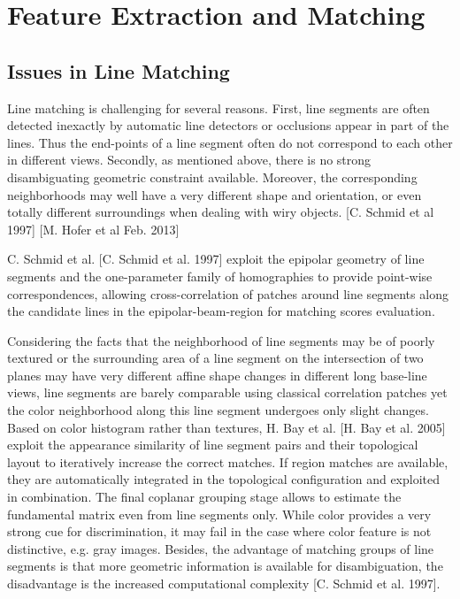 \section{Feature Extraction and Matching}


\subsection{Issues in Line Matching}

Line matching is challenging for several reasons. First, line segments are often detected inexactly by automatic line detectors or occlusions appear in part of the lines. Thus the end-points of a line segment often do not correspond to each other in different views. Secondly, as mentioned above, there is no strong disambiguating geometric constraint available. Moreover, the corresponding neighborhoods may well have a very different shape and orientation, or even totally different surroundings when dealing with wiry objects. [C. Schmid et al 1997] [M. Hofer et al Feb. 2013]

C. Schmid et al. [C. Schmid et al. 1997] exploit the epipolar geometry of line segments and the one-parameter family of homographies to provide point-wise correspondences, allowing cross-correlation of patches around line segments along the candidate lines in the epipolar-beam-region for matching scores evaluation.

Considering the facts that the neighborhood of line segments may be of poorly textured or the surrounding area of a line segment on the intersection of two planes may have very different affine shape changes in different long base-line views, line segments are barely comparable using classical correlation patches yet the color neighborhood along this line segment undergoes only slight changes. Based on color histogram rather than textures, H. Bay et al. [H. Bay et al. 2005] exploit the appearance similarity of line segment pairs and their topological layout to iteratively increase the correct matches. If region matches are available, they are automatically integrated in the topological configuration and exploited in combination. The final coplanar grouping stage allows to estimate the fundamental matrix even from line segments only. While color provides a very strong cue for discrimination, it may fail in the case where color feature is not distinctive, e.g. gray images. Besides, the advantage of matching groups of line segments is that more geometric information is available for disambiguation, the disadvantage is the increased computational complexity [C. Schmid et al. 1997].

